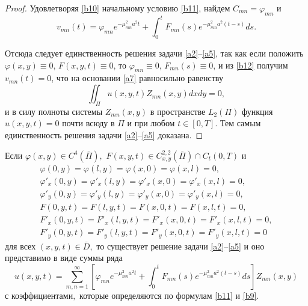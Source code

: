 \begin{proof}
Удовлетворяя \eqref{b10} начальному условию \eqref{b11}, найдем $C_{mn}=\varphi_{mn}$ и
\begin{equation}
\label{b12}
v_{mn}(t)=\varphi_{mn}e^{-\mu_{mn}^2a^2t}+\int_0^tF_{mn}(s)e^{-\mu_{mn}^2a^2(t-s)}ds.
\end{equation}

Отсюда следует единственность решения задачи \eqref{a2}--\eqref{a5}, так как если положить $\varphi(x,y)\equiv0$, 
 $F(x,y,t)\equiv0$, то $\varphi_{mn}\equiv0$, $F_{mn}(s)\equiv0$, и из \eqref{b12} получим $v_{mn}(t)=0$, что на основании \eqref{a7} равносильно равенству
$$\iint_\Pi u(x,y,t)Z_{mn}(x,y)dxdy=0,$$
и в силу полноты системы $Z_{mn}(x,y)$ в пространстве $L_2(\Pi)$ функция ${u(x,y,t){=}0}$ почти всюду в $\Pi$ и при любом $t\in[0, T]$. 
Тем самым единственность решения задачи \eqref{a2}--\eqref{a5} доказана.
\end{proof}

\smallskip

\hypertarget{zay:th2}{}

\begin{theorem}[2] 
Если $\varphi(x,y)\in C^4(\overline{\Pi}),$ $ F(x,y,t)\in C^{2,2}_{x,y}(\overline{\Pi})\cap C_t(0,T)$ и
\begin{gather}
\label{a10}
\varphi(0, y)=\varphi(l,y)=\varphi(x, 0)=\varphi(x,l)=0,\\
\varphi'_x(0, y)=\varphi'_x(l,y)=\varphi'_x(x, 0)=\varphi'_x(x,l)=0,\\
\varphi'_y(0, y)=\varphi'_y(l,y)=\varphi'_y(x, 0)=\varphi'_y(x,l)=0,\\
\label{a11}
F(0, y,t)=F(l,y,t)=F(x, 0, t)=F(x,l,t)=0,\\
F'_x(0, y,t)=F'_x(l,y,t)=F'_x(x, 0, t)=F'_x(x,l,t)=0,\\
F'_y(0, y,t)=F'_y(l,y,t)=F'_y(x, 0, t)=F'_y(x,l,t)=0
\end{gather}
для всех $(x,y,t)\in \overline{D},$ то существует решение задачи \eqref{a2}--\eqref{a5} и оно представимо в виде суммы ряда
\begin{equation}
\label{a12}
u(x,y,t)=\sum_{m,n=1}^\infty\left[\varphi_{mn}e^{-\mu_{mn}^2a^2t}+\int_0^tF_{mn}(s)e^{-\mu_{mn}^2a^2(t-s)}ds\right]Z_{mn}(x,y)\end{equation}
с коэффициентами$,$ которые определяются по формулам \eqref{b11} и \eqref{b9}.
\end{theorem}

\smallskip

